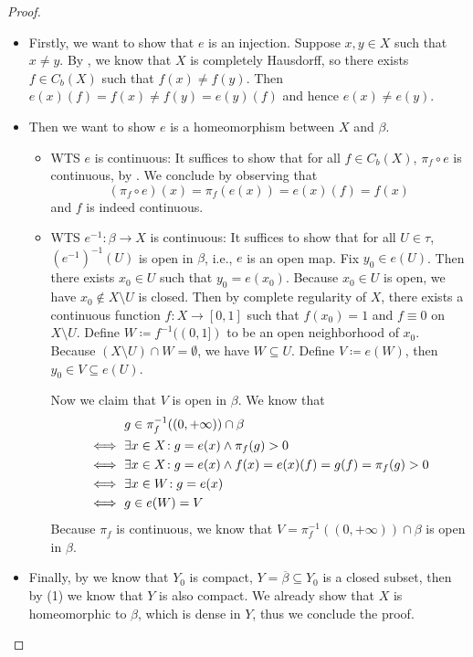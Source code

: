 \documentclass[screen]{techreport}
\numberwithin{equation}{section}
\begin{document}
\begin{proof}\
	\begin{itemize}
		\item Firstly, we want to show that $e$ is an injection.
		Suppose $x,y \in X$ such that $x \neq y$.
		By , we know that $X$ is completely Hausdorff, so there exists $f \in C_b(X)$ such that $f(x) \neq f(y)$.
		Then $e(x)(f) = f(x) \neq f(y) = e(y)(f)$ and hence $e(x) \neq e(y)$.
		
		\item Then we want to show $e$ is a homeomorphism between $X$ and $\beta$.
		\begin{itemize}
			\item WTS $e$ is continuous: It suffices to show that for all $f \in C_b(X)$, $\pi_f \circ e$ is continuous, by .
			We conclude by observing that
			\[
			(\pi_f \circ e)(x) = \pi_f(e(x)) = e(x)(f) = f(x)
			\]
			and $f$ is indeed continuous.
			\item WTS $e^{-1} : \beta \to X$ is continuous: It suffices to show that for all $U \in \tau$, $(e^{-1})^{-1}(U)$ is open in $\beta$, i.e., $e$ is an open map.
			Fix $y_0 \in e(U)$. Then there exists $x_0 \in U$ such that $y_0 = e(x_0)$.
			Because $x_0 \in U$ is open, we have $x_0 \not\in X \setminus U$ is closed.
			Then by complete regularity of $X$, there exists a continuous function $f : X \to [0,1]$ such that $f(x_0)=1$ and $f \equiv 0$ on $X \setminus U$.
			Define $W \coloneqq f^{-1}((0,1])$ to be an open neighborhood of $x_0$.
			Because $(X \setminus U) \cap W = \emptyset$, we have $W \subseteq U$.
			Define $V \coloneqq e(W)$, then $y_0 \in V \subseteq e(U)$.
			
			Now we claim that $V$ is open in $\beta$. We know that
			\begin{align}
				& g \in \pi_f^{-1}((0,+\infty)) \cap \beta \\
				\iff~ & \exists {x \in X}\!: g = e(x) \wedge \pi_f(g) > 0 \\
				\iff~ & \exists {x \in X }\!: g=e(x) \wedge f(x)=e(x)(f)=g(f) = \pi_f(g) > 0 \\
				\iff~& \exists {x \in W}\!: g = e(x) \\
				\iff~ & g \in e(W) = V 
			\end{align}
			Because $\pi_f$ is continuous, we know that $V = \pi^{-1}_f((0,+\infty)) \cap \beta$ is open in $\beta$.
		\end{itemize}
		
		\item Finally, by  we know that $Y_0$ is compact, $Y = \overline{\beta} \subseteq Y_0$ is a closed subset, then by (1) we know that $Y$ is also compact.
		We already show that $X$ is homeomorphic to $\beta$, which is dense in $Y$, thus we conclude the proof.
	\end{itemize}
\end{proof}
\end{document}
